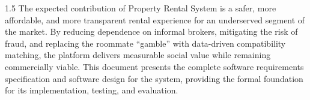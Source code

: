 \begin{spacing}{1.5}
The expected contribution of Property Rental System is a safer, more affordable, and more transparent rental experience for an underserved segment of the market. By reducing dependence on informal brokers, mitigating the risk of fraud, and replacing the roommate ``gamble'' with data-driven compatibility matching, the platform delivers measurable social value while remaining commercially viable. This document presents the complete software requirements specification and software design for the system, providing the formal foundation for its implementation, testing, and evaluation.

\end{spacing}
\newpage
